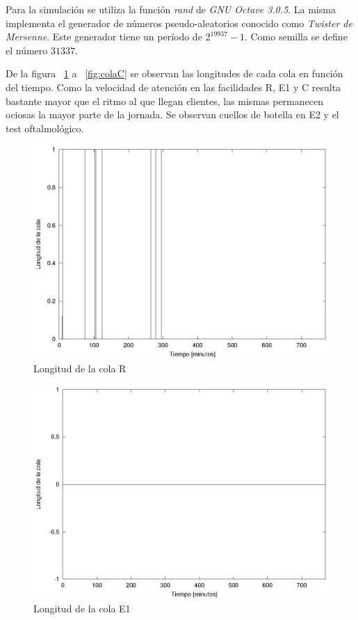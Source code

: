 \documentclass[a4paper,10pt]{article}
\begin{document}
Para la simulaci\'on se utiliza la funci\'on \textit{rand} de 
\textit{GNU Octave 3.0.5}. La misma implementa el generador de n\'umeros
pseudo-aleatorios conocido como \textit{Twister de Mersenne}. Este generador
tiene un per\'iodo de $2^{19937} - 1$. Como semilla se define el n\'umero
$31337$.


De la figura  ~\ref{fig:colaR} a  ~\ref{fig:colaC} se observan las longitudes
de cada cola en funci\'on del tiempo. Como la velocidad de atenci\'on en las
facilidades R, E1 y C resulta bastante mayor que el ritmo al que llegan
clientes, las mismas permanecen ociosas la mayor parte de la jornada.
Se observan cuellos de botella en E2 y el test oftalmol\'ogico.

\begin{figure}[hp]
\centering
\includegraphics{graficos/plot_longitud_R.eps}
\caption{Longitud de la cola R}
\label{fig:colaR}
\end{figure}

\begin{figure}[hp]
\centering
\includegraphics{graficos/plot_longitud_E1.eps}
\caption{Longitud de la cola E1}
\label{fig:colaE1}
\end{figure}
\end{document}
